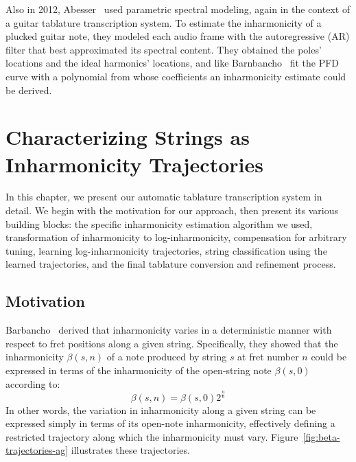 \documentclass[12pt]{cmuthesis}
\begin{document}
Also in 2012, Abesser~\cite{abesser2012} used parametric spectral modeling, again in the context of a guitar tablature transcription system. To estimate the inharmonicity of a plucked guitar note, they modeled each audio frame with the autoregressive (AR) filter that best approximated its spectral content. They obtained the poles' locations and the ideal harmonics' locations, and like Barnbancho~\cite{barbanchoi2012} fit the PFD curve with a polynomial from whose coefficients an inharmonicity estimate could be derived.



\noindent
\chapter{Characterizing Strings as Inharmonicity Trajectories}
\label{chap:method}
In this chapter, we present our automatic tablature transcription system in detail. We begin with the motivation for our approach, then present its various building blocks: the specific inharmonicity estimation algorithm we used, transformation of inharmonicity to log-inharmonicity, compensation for arbitrary tuning, learning log-inharmonicity trajectories, string classification using the learned trajectories, and the final tablature conversion and refinement process.
\section{Motivation}
Barbancho~\cite{barbanchoi2012} derived that inharmonicity varies in a deterministic manner with respect to fret positions along a given string. Specifically, they showed that the inharmonicity $\beta(s,n)$ of a note produced by string $s$ at fret number $n$ could be expressed in terms of the inharmonicity of the open-string note $\beta(s,0)$ according to:
\begin{equation} 
\label{eq:beta-traj}
\beta(s,n) = \beta(s,0)2^{\frac{n}{6}}
\end{equation}
In other words, the variation in inharmonicity along a given string can be expressed simply in terms of its open-note inharmonicity, effectively defining a restricted trajectory along which the inharmonicity must vary. Figure~\ref{fig:beta-trajectories-ag} illustrates these trajectories.
\end{document}
